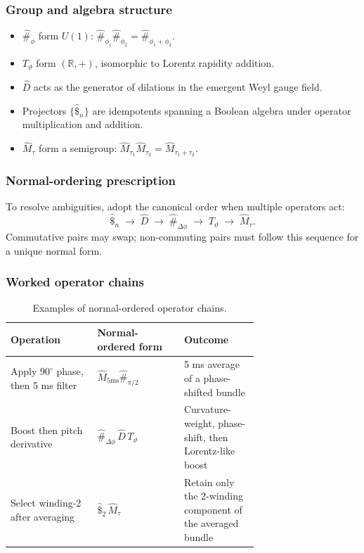\subsubsection{Group and algebra structure}

\begin{itemize}[leftmargin=1.5em]
  \item \(\hat{\#}_{\phi}\) form \(U(1)\): \(\hat{\#}_{\phi_{1}}\hat{\#}_{\phi_{2}}=\hat{\#}_{\phi_{1}+\phi_{2}}\).
  \item \(T_{\vartheta}\) form \((\mathbb{R},+)\), isomorphic to Lorentz rapidity addition.
  \item \(\hat{D}\) acts as the generator of dilations in the emergent Weyl gauge field.
  \item Projectors \(\{\hat{\$}_{n}\}\) are idempotents spanning a Boolean algebra under operator multiplication and addition.
  \item \(\hat{M}_{\tau}\) form a semigroup: \(\hat{M}_{\tau_{1}}\hat{M}_{\tau_{2}}=\hat{M}_{\tau_{1}+\tau_{2}}\).
\end{itemize}

\subsubsection{Normal-ordering prescription}

To resolve ambiguities, adopt the canonical order when multiple operators act:
\[
  \hat{\$}_{n}
  \;\to\;
  \hat{D}
  \;\to\;
  \hat{\#}_{\Delta\phi}
  \;\to\;
  T_{\vartheta}
  \;\to\;
  \hat{M}_{\tau}.
\]
Commutative pairs may swap; non-commuting pairs must follow this sequence for a unique normal form.

\subsubsection{Worked operator chains}

\begin{table}[H]
  \small
  \centering
  \caption{Examples of normal-ordered operator chains.}
  \label{tab:operator-chains}
  \renewcommand{\arraystretch}{1.15}
  \begin{tabularx}{\linewidth}{@{}p{0.35\linewidth} p{0.35\linewidth} X@{}}
    \toprule
    \textbf{Operation}                                        & \textbf{Normal-ordered form}                      & \textbf{Outcome} \\
    \midrule
    Apply \(90^\circ\) phase, then 5 ms filter                & \(\hat{M}_{5\mathrm{ms}}\hat{\#}_{\pi/2}\)        & 5 ms average of a phase-shifted bundle \\
    Boost then pitch derivative                               & \(\hat{\#}_{\Delta\phi}\,\hat{D}\,T_{\vartheta}\) & Curvature-weight, phase-shift, then Lorentz-like boost \\
    Select winding-2 after averaging                          & \(\hat{\$}_{2}\,\hat{M}_{\tau}\)                  & Retain only the 2-winding component of the averaged bundle \\
    \bottomrule
  \end{tabularx}
\end{table}

